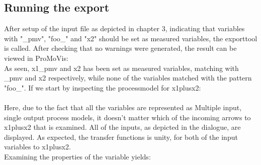 \subsection{Running the export}
After setup of the input file as depicted in chapter 3, indicating that variables with "\_pmv", "foo\_" and "x2" should be set as measured variables, the exporttool is called. After checking that no warnings were generated, the result can be viewed in ProMoVis:
\setlength\fboxsep{0pt}
\setlength\fboxrule{0.5pt}
\\\newline
As seen,  x1\_pmv and x2 has been set as measured variables, matching with \_pmv and x2 respectively, while none of the variables matched with the pattern "foo\_". If we start by inspecting the processmodel for x1plusx2:\\\newline
\setlength\fboxsep{0pt}
\setlength\fboxrule{0.5pt}
\\\newline
Here, due to the fact that all the variables are represented as Multiple input, single output process models, it doesn't matter which of the incoming arrows to x1plusx2 that is examined. All of the inputs, as depicted in the dialogue, are displayed. As expected, the transfer functions is unity, for both of the input variables to x1plusx2. \\\newline
Examining the properties of the variable yields:


